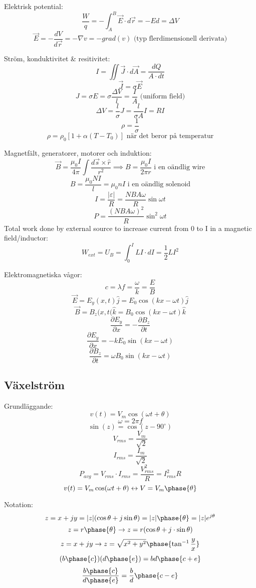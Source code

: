 \documentclass{article}
\begin{document}
Elektrisk potential:
\[ \frac{W}{q} = -\int_A^B \vec{E} \cdot d\vec{r} = -Ed = \Delta V \]
\[ \vec{E} = -\frac{dV}{d\vec{r}} = -\nabla v  = -grad(v) \textrm{ (typ flerdimensionell derivata)} \]

Ström, konduktivitet \& resitivitet:
\[ I = \iint \vec{J} \cdot d\vec{A} = \frac{dQ}{A \cdot dt} \]
\[ \vec{J} = \sigma \vec{E} \]
\[ J = \sigma E = \sigma \frac{\Delta V}{l} = \frac{I}{A} \textrm{ (uniform field)} \]
\[ \Delta V = \frac{l}{\sigma}J = \frac{l}{\sigma A} I = RI \]
\[ \rho = \frac{1}{\sigma} \]
\[ \rho = \rho_0 [1 + \alpha (T - T_0)] \textrm{ när det beror på temperatur} \]

Magnetfält, generatorer, motorer och induktion:
\[ \vec{B} = \frac{\mu_0 I}{4\pi} \int \frac{d \vec{s} \times \hat{r}}{r^2} \implies B = \frac{\mu_0 I}{2\pi r} \textrm{ i en oändlig wire} \]
\[ B = \frac{\mu_0 NI}{l} = \mu_0 nI \textrm{ i en oändlig solenoid} \]
\[ I = \frac{|\varepsilon|}{R} = \frac{NBA\omega}{R} \sin \omega t \]
\[ P = \frac{(NBA\omega)^2}{R} \sin^2 \omega t\]
Total work done by external source to increase current from 0 to I in a magnetic field/inductor: \[ W_{ext} = U_B = \int_0^I LI \cdot dI  = \frac{1}{2}LI^2 \]

Elektromagnetiska vågor:
\[ c = \lambda f = \frac{\omega}{k} = \frac{E}{B} \]
\[ \vec{E} = E_y(x, t) \hat{j} = E_0 \cos(kx-\omega t) \hat{j} \]
\[ \vec{B} = B_z(x, t( \hat{k} = B_0 \cos(kx-\omega t) \hat{k} \]
\[ \frac{\partial E_y}{\partial x} = -\frac{\partial  B_z}{\partial t} \]
\[ \frac{\partial E_y}{\partial x}  = -kE_0 \sin(kx - \omega t) \]
\[ \frac{\partial B_z}{\partial t} = \omega B_0 \sin(kx-\omega t) \]

\subsection{Växelström}
Grundläggande:
\[ v(t) = V_m \cos(\omega t + \theta) \]
\[ \omega = 2 \pi f \]
\[ \sin(z) = \cos(z - 90^\circ) \]
\[ V_{rms} = \frac{V_m}{\sqrt{2}} \]
\[ I_{rms} = \frac{I_m}{\sqrt{2}} \]
\[ P_{avg} = V_{rms} \cdot I_{rms} = \frac{V^2_{rms}}{R} = I^2_{rms} R \]
\[ v(t) = V_m \cos(\omega t + \theta) \leftrightarrow V = V_m \phase{\theta} \]

Notation:
\[ z = x + jy = |z|(\cos \theta + j \sin \theta) = |z| \phase{\theta} = |z| e^{j \theta} \]
\[ z = r \phase{\theta} \rightarrow z = r( \cos \theta + j \cdot \sin \theta ) \]
\[ z = x + jy \rightarrow z = \sqrt{x^2 + y^2} \phase{ \tan^{-1} \frac{y}{x} } \]
\[ (b \phase{c})(d \phase{e}) = bd \phase{c+e} \]
\[ \frac{b \phase{c}}{d \phase{e}} = \frac{b}{d} \phase{c-e} \]
\end{document}

